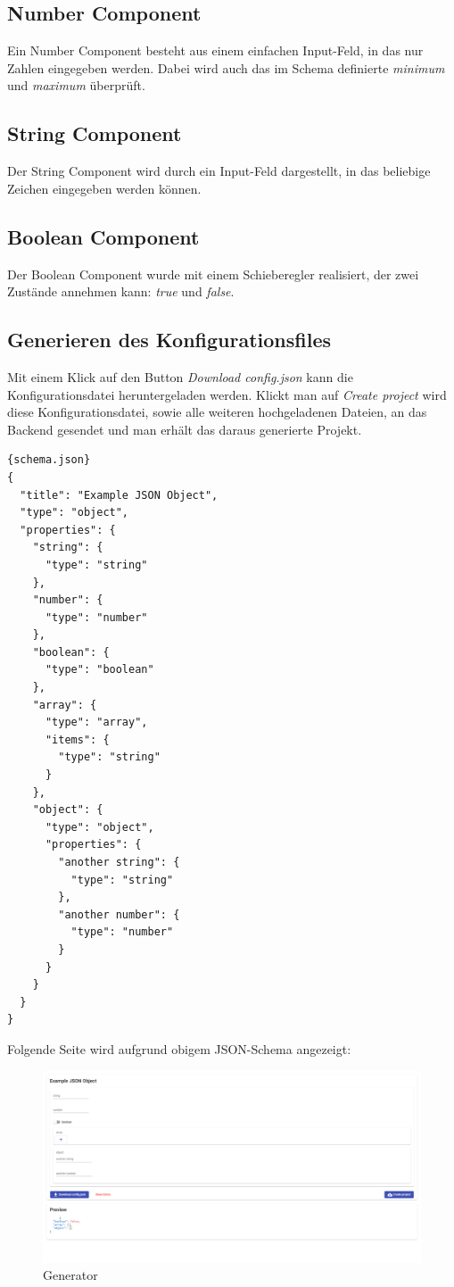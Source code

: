 \subsection{Number Component}
Ein Number Component besteht aus einem einfachen Input-Feld, in das nur Zahlen eingegeben werden.
Dabei wird auch das im Schema definierte \textit{minimum} und \textit{maximum} überprüft.

\subsection{String Component}
Der String Component wird durch ein Input-Feld dargestellt, in das beliebige Zeichen eingegeben werden können.

\subsection{Boolean Component}
Der Boolean Component wurde mit einem Schieberegler realisiert, der zwei Zustände annehmen kann: \textit{true} und
\textit{false}.

\subsection{Generieren des Konfigurationsfiles}
Mit einem Klick auf den Button \textit{Download config.json} kann die Konfigurationsdatei heruntergeladen werden.
Klickt man auf \textit{Create project} wird diese Konfigurationsdatei, sowie alle weiteren hochgeladenen Dateien, an
das Backend gesendet und man erhält das daraus generierte Projekt.

\begin{lstlisting}[label={lst:schema.json}]{schema.json}
{
  "title": "Example JSON Object",
  "type": "object",
  "properties": {
    "string": {
      "type": "string"
    },
    "number": {
      "type": "number"
    },
    "boolean": {
      "type": "boolean"
    },
    "array": {
      "type": "array",
      "items": {
        "type": "string"
      }
    },
    "object": {
      "type": "object",
      "properties": {
        "another string": {
          "type": "string"
        },
        "another number": {
          "type": "number"
        }
      }
    }
  }
}
\end{lstlisting}

Folgende Seite wird aufgrund obigem JSON-Schema angezeigt:

\begin{figure}[hbt!]
    \centering
    \includegraphics[scale=.2]{pics/generator}
    \caption{Generator}
\end{figure}


